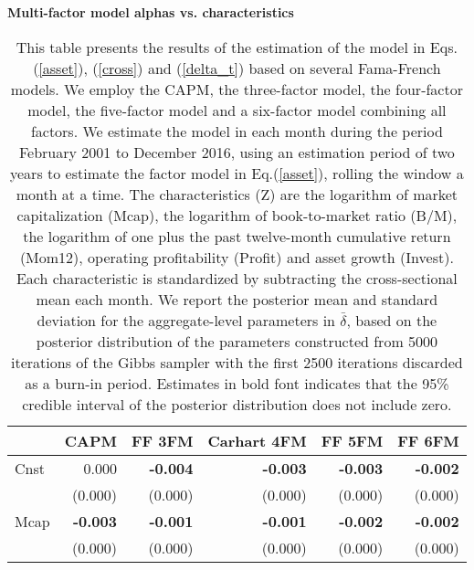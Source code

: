  \begin{singlespacing}
 \begin{table}[H]
\small
\centering
\setlength{\tabcolsep}{16.5pt}
{\captionsetup{justification=centering,singlelinecheck=off}
\caption{\bfseries Multi-factor model alphas vs. characteristics} \label{table4}}
\caption*{This table presents the results of the estimation of the model in Eqs.(\ref{asset}), (\ref{cross}) and (\ref{delta_t}) based on several Fama-French models. We employ the CAPM, the \citet{fama1993common} three-factor model, the \citet{carhart1997persistence} four-factor model, the \citet{FAMA20151} five-factor model and a six-factor model combining all factors. We estimate the model in each month during the period February 2001 to December 2016, using an estimation period of two years to estimate the factor model in Eq.(\ref{asset}), rolling the window a month at a time. 
 The characteristics (Z) are the logarithm of market capitalization (Mcap), the logarithm of book-to-market ratio (B/M), the logarithm of one plus the past twelve-month cumulative return (Mom12), operating profitability (Profit) and asset growth (Invest). Each characteristic is standardized by subtracting the cross-sectional mean each month. We report the posterior mean and standard deviation for the aggregate-level parameters in $\bar{\delta}$, based on the posterior distribution of the parameters constructed from 5000 iterations of the Gibbs sampler with the first 2500 iterations discarded as a burn-in period. Estimates in bold font indicates that the 95\% credible interval of the posterior distribution does not include zero. 
}
\begin{tabular}{lrrrrr}
\hline
\multicolumn{1}{l}{} & \multicolumn{1}{l}{CAPM} & \multicolumn{1}{l}{FF 3FM} & \multicolumn{1}{l}{Carhart 4FM} & \multicolumn{1}{l}{FF 5FM} & \multicolumn{1}{l}{FF 6FM} \\ \hline
Cnst & 0.000 & \textbf{-0.004}     & \textbf{-0.003}     & \textbf{-0.003}  & \textbf{-0.002} \\ & (0.000) & (0.000)& (0.000) & (0.000) & (0.000) \\ 
Mcap                 & \textbf{-0.003}          & \textbf{-0.001}                     & \textbf{-0.001}                 & \textbf{-0.002}                     & \textbf{-0.002}                     \\
                     & (0.000)                   & (0.000)                              & (0.000)                          & (0.000)                              & (0.000)                              \\

\end{tabular}
\end{table}
\end{singlespacing}

